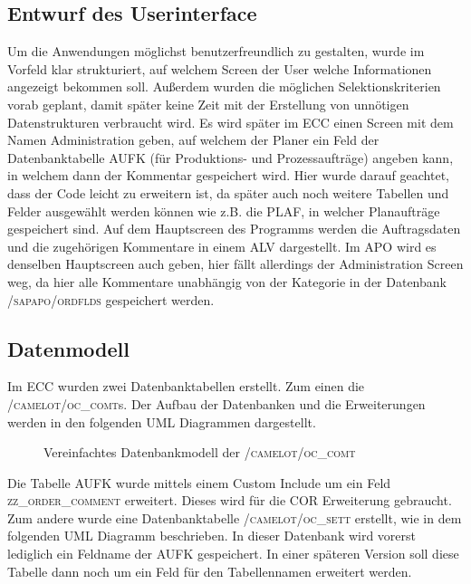 \subsection{Entwurf des Userinterface}
\label{sec:Benutzeroberflaeche} 
Um die Anwendungen möglichst benutzerfreundlich zu gestalten, wurde im Vorfeld klar strukturiert, auf welchem Screen der User welche Informationen angezeigt bekommen soll. Außerdem wurden die möglichen Selektionskriterien vorab geplant, damit später keine Zeit mit der Erstellung von unnötigen Datenstrukturen verbraucht wird. Es wird später im \ac{ECC} einen Screen mit dem Namen Administration geben, auf welchem der Planer ein Feld der Datenbanktabelle AUFK (für Produktions- und Prozessaufträge) angeben kann, in welchem dann der Kommentar gespeichert wird. Hier wurde darauf geachtet, dass der Code leicht zu erweitern ist, da später auch noch weitere Tabellen und Felder ausgewählt werden können wie z.B. die PLAF, in welcher Planaufträge gespeichert sind. Auf dem Hauptscreen des Programms werden die Auftragsdaten und die zugehörigen Kommentare in einem \ac{ALV} dargestellt. Im \ac{APO} wird es denselben Hauptscreen auch geben, hier fällt allerdings der Administration Screen weg, da hier alle Kommentare unabhängig von der Kategorie in der Datenbank \textsc{/sapapo/ordflds} gespeichert werden. 

\subsection{Datenmodell}
\label{sec:Datenmodell}
Im ECC wurden zwei Datenbanktabellen erstellt. Zum einen die \textsc{/camelot/oc\_comt}s. Der Aufbau der Datenbanken und die Erweiterungen werden in den folgenden \ac{UML} Diagrammen dargestellt.

\begin{figure}[htb]
\centering
{}
\caption{Vereinfachtes Datenbankmodell der \textsc{/camelot/oc\_comt}}
\label{fig:ECC01}
\end{figure} 

Die Tabelle AUFK wurde mittels einem Custom Include um ein Feld \textsc{zz\_order\_comment} erweitert. Dieses wird für die COR Erweiterung gebraucht. Zum andere wurde eine Datenbanktabelle \textsc{/camelot/oc\_sett} erstellt, wie in dem folgenden \ac{UML} Diagramm beschrieben. In dieser Datenbank wird vorerst lediglich ein Feldname der AUFK gespeichert. In einer späteren Version soll diese Tabelle dann noch um ein Feld für den Tabellennamen erweitert werden.

